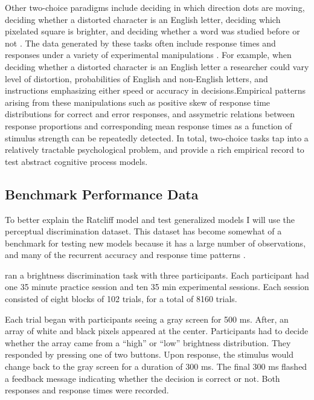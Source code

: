 \documentclass[12pt]{article}
\begin{document}
Other two-choice paradigms include deciding in which direction dots are
moving, deciding whether a distorted character is an English letter,
deciding which pixelated square is brighter, and deciding whether a word
was studied before or not
\citep{SmiRat2004,RatSmi2004,RatRou1998,PerVan2002}. The data generated by
these tasks often include response times and responses under a variety of
experimental manipulations \citep{Luc1986}. For example, when
deciding whether a distorted character is an English letter a researcher
could vary level of distortion, probabilities of English and non-English
letters, and instructions emphasizing either speed or accuracy in
decisions.Empirical patterns arising from these manipulations such as positive skew of response time distributions for correct and error responses, and assymetric relations between response proportions
and corresponding mean response times as a function of stimulus strength can be
repeatedly detected. In total, two-choice tasks tap into a relatively tractable psychological problem, and provide a rich empirical record to test abstract cognitive process models.
    
\subsection{Benchmark Performance Data}
To better explain the Ratcliff model and test generalized models I will use the \citet{RatRou1998} perceptual discrimination dataset. This dataset has become somewhat of a benchmark for testing new models because it has a large number of observations, and many of the recurrent accuracy and response time patterns \citep{VanTue2008,VanTue2011}.

\citet{RatRou1998} ran a
brightness discrimination task with three participants. Each participant had one 35 minute practice session and ten 35 min experimental sessions. Each session consisted of eight blocks of 102 trials, for a total of 8160 trials. 

Each trial began with participants seeing a gray screen for 500 ms. After, an array of white and black pixels appeared at the center. Participants had to decide whether the array came from a ``high'' or ``low''
brightness distribution. They responded by pressing one of two buttons. Upon response, the stimulus would change back to the gray screen for a duration of 300 ms. The final 300 ms flashed a feedback message indicating whether the decision is correct or not. Both responses and response times were recorded.
\end{document}
